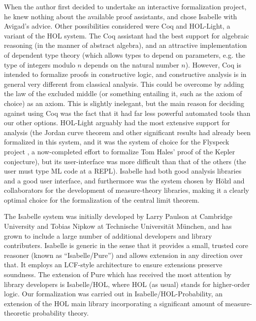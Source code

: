\documentclass{article}
\theoremstyle{definition}
\begin{document}
When the author first decided to undertake an interactive formalization project, he knew nothing about the available proof assistants, and chose Isabelle with Avigad's advice. Other possibilities considered were Coq and HOL-Light, a variant of the HOL system. The Coq assistant \cite{coq-ref} had the best support for algebraic reasoning (in the manner of abstract algebra), and an attractive implementation of dependent type theory (which allows types to depend on parameters, e.g. the type of integers modulo $n$ depends on the natural number $n$). However, Coq is intended to formalize proofs in constructive logic, and constructive analysis is in general very different from classical analysis. This could be overcome by adding the law of the excluded middle (or something entailing it, such as the axiom of choice) as an axiom. This is slightly inelegant, but the main reason for deciding against using Coq was the fact that it had far less powerful automated tools than our other options. HOL-Light \cite{harrison-hol-light} arguably had the most extensive support for analysis (the Jordan curve theorem \cite{hales-jordan} and other significant results had already been formalized in this system, and it was the system of choice for the Flyspeck project \cite{hales-kepler}, a now-completed effort to formalize Tom Hales' proof of the Kepler conjecture), but its user-interface was more difficult than that of the others (the user must type ML code at a REPL). Isabelle had both good analysis libraries and a good user interface, and furthermore was the system chosen by H\"olzl and collaborators for the development of measure-theory libraries, making it a clearly optimal choice for the formalization of the central limit theorem.

The Isabelle system was initially developed by Larry Paulson at Cambridge University and Tobias Nipkow at Technische Universit\"at M\"unchen, and has grown to include a large number of additional developers and library contributers. Isabelle is generic in the sense that it provides a small, trusted core reasoner (known as ``Isabelle/Pure'') and allows extension in any direction over that. It employs an LCF-style architecture \cite{gordon-lcf} to ensure extensions preserve soundness. The extension of Pure which has received the most attention by library developers is Isabelle/HOL, where HOL (as usual) stands for higher-order logic. Our formalization was carried out in Isabelle/HOL-Probability, an extension of the HOL main library incorporating a significant amount of measure-theoretic probability theory.
\end{document}
